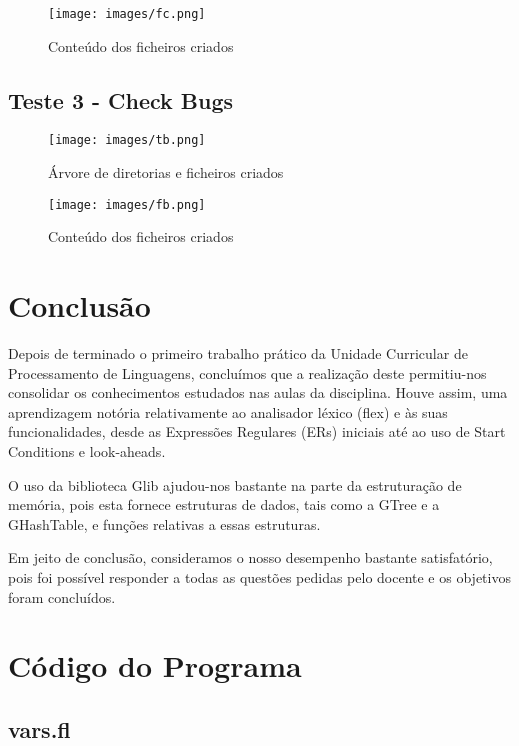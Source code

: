 \documentclass[12pt]{article}
\begin{document}
\begin{figure}[H]
    \centering
    \texttt{[image: images/fc.png]}
    \caption{Conteúdo dos ficheiros criados}
\end{figure}

\subsection{Teste 3 - Check Bugs}

\begin{figure}[H]
    \centering
    \texttt{[image: images/tb.png]}
    \caption{Árvore de diretorias e ficheiros criados}
\end{figure}

\begin{figure}[H]
    \centering
    \texttt{[image: images/fb.png]}
    \caption{Conteúdo dos ficheiros criados}
\end{figure}

\newpage

\section{Conclusão}

Depois de terminado o primeiro trabalho prático da Unidade Curricular de Processamento de Linguagens, concluímos que a realização deste permitiu-nos consolidar os conhecimentos estudados nas aulas da disciplina. Houve assim, uma aprendizagem notória relativamente ao analisador léxico (flex) e às suas funcionalidades, desde as Expressões Regulares (ERs) iniciais até ao uso de Start Conditions e look-aheads.

O uso da biblioteca Glib ajudou-nos bastante na parte da estruturação de memória, pois esta fornece estruturas de dados, tais como a GTree e a GHashTable, e funções relativas a essas estruturas.

Em jeito de conclusão, consideramos o nosso desempenho bastante satisfatório, pois foi possível responder a todas as questões pedidas pelo docente e os objetivos foram concluídos.

\newpage

\appendix
\section{Código do Programa}

\subsection{vars.fl}
\end{document}
